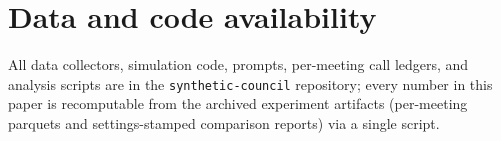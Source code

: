 \documentclass[11pt,a4paper]{article}
\begin{document}
\section*{Data and code availability}

All data collectors, simulation code, prompts, per-meeting call ledgers, and analysis scripts are in the \texttt{synthetic-council} repository; every number in this paper is recomputable from the archived experiment artifacts (per-meeting parquets and settings-stamped comparison reports) via a single script.

\printbibliography
\end{document}
